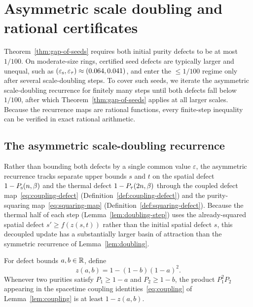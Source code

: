 \chapter{Asymmetric scale doubling and rational certificates}
\label{chap:chain}

Theorem~\ref{thm:gap-of-seeds} requires both initial purity defects to be at most \(1/100\). On
moderate-size rings, certified seed defects are typically larger and unequal, such as
\((\varepsilon_{\mathrm{s}}, \varepsilon_{\tau}) \approx (0.064, 0.041)\), and enter the \(\le 1/100\) regime only after several
scale-doubling steps. To cover such seeds, we iterate the asymmetric scale-doubling recurrence for
finitely many steps until both defects fall below \(1/100\), after which
Theorem~\ref{thm:gap-of-seeds} applies at all larger scales. Because the recurrence maps are
rational functions, every finite-step inequality can be verified in exact rational arithmetic.

\section{The asymmetric scale-doubling recurrence}

Rather than bounding both defects by a single common value \(\varepsilon\), the asymmetric
recurrence tracks separate upper bounds \(s\) and \(t\) on the spatial defect
\(1 - P_{\mathrm{s}}(n, \beta)\) and the thermal defect \(1 - P_{\tau}(2n, \beta)\) through the coupled defect
map~\eqref{eq:coupling-defect} (Definition~\ref{def:coupling-defect}) and the purity-squaring
map~\eqref{eq:squaring-map} (Definition~\ref{def:squaring-defect}). Because the thermal half of
each step (Lemma~\ref{lem:doubling-step}) uses the already-squared spatial defect
\(s' \ge f(z(s, t))\) rather than the initial spatial defect \(s\), this decoupled update has a
substantially larger basin of attraction than the symmetric recurrence of Lemma~\ref{lem:doubling}.

\begin{definition}
  \label{def:coupling-defect}
  \leanok
  For defect bounds \(a, b \in \mathbb{R}\), define
  \begin{equation}
    \label{eq:coupling-defect}
    z(a, b) = 1 - (1 - b)(1 - a)^2.
  \end{equation}
  Whenever two purities satisfy \(P_1 \ge 1 - a\) and \(P_2 \ge 1 - b\), the product \(P_1^2 P_2\)
  appearing in the spacetime coupling identities~\eqref{eq:coupling} of Lemma~\ref{lem:coupling} is
  at least \(1 - z(a, b)\).
\end{definition}

